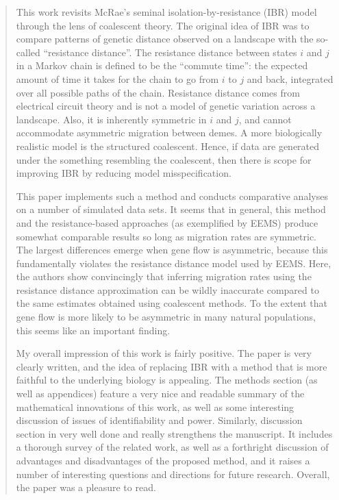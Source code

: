 \begin{quote}
    This work revisits McRae’s seminal isolation-by-resistance (IBR) model through
    the lens of coalescent theory. The original idea of IBR was to compare patterns of
    genetic distance observed on a landscape with the so-called ``resistance distance''.
    The resistance distance between states $i$ and $j$ in a Markov chain is defined to be
    the ``commute time'': the expected amount of time it takes for the chain to go
    from $i$ to $j$ and back, integrated over all possible paths of the chain. Resistance
    distance comes from electrical circuit theory and is not a model of genetic
    variation across a landscape. Also, it is inherently symmetric in $i$ and $j$, and
    cannot accommodate asymmetric migration between demes. A more biologically
    realistic model is the structured coalescent. Hence, if data are generated under
    the something resembling the coalescent, then there is scope for improving IBR
    by reducing model misspecification.

    This paper implements such a method and conducts comparative analyses on a
    number of simulated data sets. It seems that in general, this method and the
    resistance-based approaches (as exemplified by EEMS) produce somewhat
    comparable results so long as migration rates are symmetric. The largest
    differences emerge when gene flow is asymmetric, because this fundamentally
    violates the resistance distance model used by EEMS. Here, the authors show
    convincingly that inferring migration rates using the resistance distance
    approximation can be wildly inaccurate compared to the same estimates
    obtained using coalescent methods. To the extent that gene flow is more
    likely to be asymmetric in many natural populations, this seems like an
    important finding.

    My overall impression of this work is fairly positive. The paper is very clearly
    written, and the idea of replacing IBR with a method that is more faithful to
    the underlying biology is appealing. The methods section (as well as appendices)
    feature a very nice and readable summary of the mathematical innovations of
    this work, as well as some interesting discussion of issues of identifiability and
    power. Similarly, discussion section in very well done and really strengthens
    the manuscript. It includes a thorough survey of the related work, as well as a
    forthright discussion of advantages and disadvantages of the proposed method,
    and it raises a number of interesting questions and directions for future research.
    Overall, the paper was a pleasure to read.
\end{quote}

